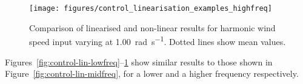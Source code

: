 \documentclass[preprint]{elsarticle}
\begin{document}
\begin{figure}
  \centering
  \hspace*{-1cm}\texttt{[image: figures/control\_linearisation\_examples\_highfreq]}
  \caption{Comparison of linearised and non-linear results for harmonic
    wind speed input varying at \SI{1.00}{\radian\per\second}. Dotted
    lines show mean values.}
\label{fig:control-lin-highfreq}
\end{figure}

Figures~\ref{fig:control-lin-lowfreq}--\ref{fig:control-lin-highfreq} show
similar results to those shown in Figure~\ref{fig:control-lin-midfreq}, for a
lower and a higher frequency respectively.
\end{document}
